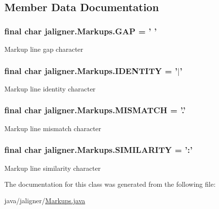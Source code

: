\subsection{Member Data Documentation}
\hypertarget{classjaligner_1_1_markups_aeeccc407eb80259ed2fba80e03c03b98}{
\subsubsection[{G\+A\+P}]{\setlength{\rightskip}{0pt plus 5cm}final char jaligner.\+Markups.\+G\+A\+P = ' '\hspace{0.3cm}{\ttfamily [static]}}}\label{classjaligner_1_1_markups_aeeccc407eb80259ed2fba80e03c03b98}
Markup line gap character \hypertarget{classjaligner_1_1_markups_af32496371126c49532d828ba52839ca8}{
\subsubsection[{I\+D\+E\+N\+T\+I\+T\+Y}]{\setlength{\rightskip}{0pt plus 5cm}final char jaligner.\+Markups.\+I\+D\+E\+N\+T\+I\+T\+Y = '$\vert$'\hspace{0.3cm}{\ttfamily [static]}}}\label{classjaligner_1_1_markups_af32496371126c49532d828ba52839ca8}
Markup line identity character \hypertarget{classjaligner_1_1_markups_a21be83383bf355000556ba7c2a042a48}{
\subsubsection[{M\+I\+S\+M\+A\+T\+C\+H}]{\setlength{\rightskip}{0pt plus 5cm}final char jaligner.\+Markups.\+M\+I\+S\+M\+A\+T\+C\+H = '.'\hspace{0.3cm}{\ttfamily [static]}}}\label{classjaligner_1_1_markups_a21be83383bf355000556ba7c2a042a48}
Markup line mismatch character \hypertarget{classjaligner_1_1_markups_a7efe6d3f877cee8e68e0dc5dd7ef92e8}{
\subsubsection[{S\+I\+M\+I\+L\+A\+R\+I\+T\+Y}]{\setlength{\rightskip}{0pt plus 5cm}final char jaligner.\+Markups.\+S\+I\+M\+I\+L\+A\+R\+I\+T\+Y = '\+:'\hspace{0.3cm}{\ttfamily [static]}}}\label{classjaligner_1_1_markups_a7efe6d3f877cee8e68e0dc5dd7ef92e8}
Markup line similarity character 

The documentation for this class was generated from the following file\+:\begin{DoxyCompactItemize}
\item 
java/jaligner/\hyperlink{_markups_8java}{Markups.\+java}\end{DoxyCompactItemize}
